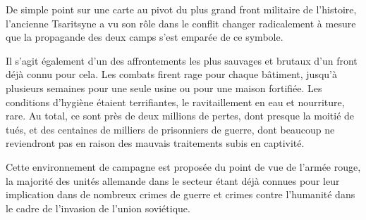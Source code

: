 \documentclass{report}
\begin{document}
\begin{multicols}{2}
De simple point sur une carte au pivot du plus grand front militaire de l'histoire, l'ancienne Tsaritsyne a vu son rôle dans le conflit changer radicalement à mesure que la propagande des deux camps s'est emparée de ce symbole.

Il s'agit également d'un des affrontements les plus sauvages et brutaux d'un front déjà connu pour cela. Les combats firent rage pour chaque bâtiment, jusqu'à plusieurs semaines pour une seule usine ou pour une maison fortifiée. Les conditions d'hygiène étaient terrifiantes, le ravitaillement en eau et nourriture, rare. Au total, ce sont près de deux millions de pertes, dont presque la moitié de tués, et des centaines de milliers de prisonniers de guerre, dont beaucoup ne reviendront pas en raison des mauvais traitements subis en captivité.

Cette environnement de campagne est proposée du point de vue de l'armée rouge, la majorité des unités allemande dans le secteur étant déjà connues pour leur implication dans de nombreux crimes de guerre et crimes contre l'humanité dans le cadre de l'invasion de l'union soviétique.

\end{multicols}
\end{document}
